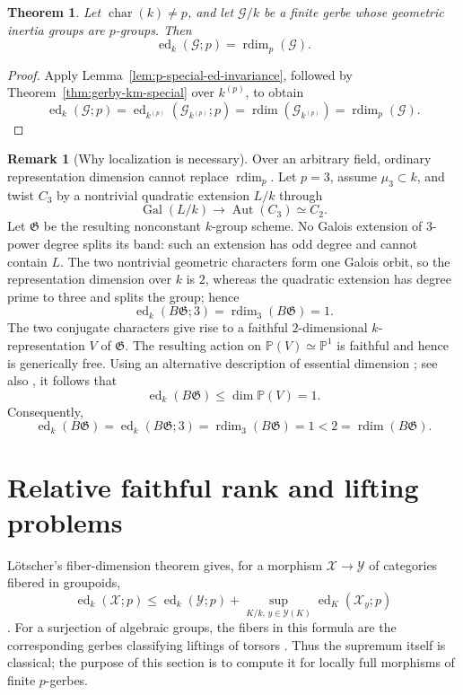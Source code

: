 \documentclass[11pt,reqno]{amsart}
\numberwithin{equation}{section}
\theoremstyle{plain}
\newtheorem{theo}[prop]{Theorem}
\theoremstyle{definition}
\newtheorem{rema}[prop]{Remark}
\def\cG{{\mathcal G}}
\def\cX{{\mathcal X}}
\def\cY{{\mathcal Y}}
\def\fG{{\mathfrak G}}
\def\ra{{\rightarrow}}
\def\rdim{{\operatorname{rdim}}}
\def\ed{{\operatorname{ed}}}
\begin{document}
\begin{theo}\label{thm:gerby-km}
Let $\operatorname{char}(k)\ne p$, and let $\cG/k$ be a finite gerbe
whose geometric inertia groups are $p$-groups.  Then
\[
\ed_k(\cG;p)=\rdim_p(\cG).
\]
\end{theo}

\begin{proof}
Apply Lemma~\ref{lem:p-special-ed-invariance}, followed by
Theorem~\ref{thm:gerby-km-special} over $k^{(p)}$, to obtain
\[
\ed_k(\cG;p)
=\ed_{k^{(p)}}(\cG_{k^{(p)}};p)
=\rdim(\cG_{k^{(p)}})
=\rdim_p(\cG).
\]
\end{proof}

\begin{rema}[Why localization is necessary]\label{rem:localization-necessary}
Over an arbitrary field, ordinary representation dimension cannot replace
$\rdim_p$.  Let $p=3$, assume $\mu_3\subset k$, and twist $C_3$
by a nontrivial quadratic extension $L/k$ through
\[
\operatorname{Gal}(L/k)\ra\operatorname{Aut}(C_3)\simeq C_2.
\]
Let $\fG$ be the resulting nonconstant $k$-group scheme.  No Galois
extension of $3$-power degree splits its band: such an extension has
odd degree and cannot contain $L$.
The two nontrivial geometric characters form one Galois orbit, so the
representation dimension over $k$ is $2$, whereas the quadratic extension has
degree prime to three and splits the group; hence
\[
\ed_k(B\fG;3)=\rdim_3(B\fG)=1.
\]
The two conjugate characters give rise to a faithful $2$-dimensional $k$-representation $V$ of $\fG$. The resulting action on $\mathbb P(V)\simeq\mathbb P^1$ is faithful and hence is generically free. Using an alternative description of essential dimension \cite[Definition~3.5]{ReichsteinED}; see also \cite[Section~3d, Proposition~3.13]{MerkurjevSurvey}, it follows that
\[
\ed_k(B\fG)\le \dim\mathbb P(V)=1.
\]
Consequently,
\[
\ed_k(B\fG)=\ed_k(B\fG;3)=\rdim_3(B\fG)=1
<2=\rdim(B\fG).
\]
\end{rema}

\section{Relative faithful rank and lifting problems}
\label{sec:relative-rank}

L\"otscher's fiber-dimension theorem gives, for a morphism
$\cX\to\cY$ of categories fibered in groupoids,
\begin{equation}\label{eq:lotscher-relative}
\ed_k(\cX;p)\leq \ed_k(\cY;p)+
\sup_{K/k,\,y\in\cY(K)}\ed_K(\cX_y;p)
\end{equation}
\cite[Theorem~1.1]{LotscherFiber}.  For a surjection of algebraic groups,
the fibers in this formula are the corresponding gerbes classifying liftings of torsors \cite[Example~3.4]{LotscherFiber}. Thus the supremum itself is classical;
the purpose of this section is to compute it for locally full morphisms of
finite $p$-gerbes.
\end{document}
